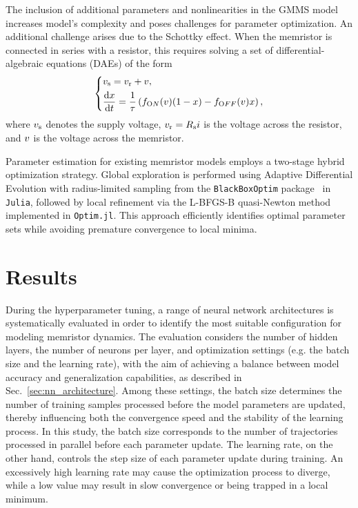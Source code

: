 \documentclass{ieeeaccess}
\begin{document}
The inclusion of additional parameters and nonlinearities in the GMMS model increases model's complexity and poses challenges for parameter optimization.
An additional challenge arises due to the Schottky effect. 
When the memristor is connected in series with a resistor, this requires solving a set of differential-algebraic equations (DAEs) of the form
\begin{equation}
  \left\{
  \begin{aligned}
     & v_{\mathrm s}=v_{\mathrm r}+ v,                                                      \\
     & \frac{{\mathrm d} {x}}{{\mathrm d} t}  = \frac{1}{\tau} \left( f_{\text ON} (v) (1-x) - f_{\text OFF} (v) x \right), 
  \end{aligned}
  \right.
  \label{eq:nonlinear_eq}
\end{equation}
where \(v_{\mathrm s}\) denotes the supply voltage, \(v_{\mathrm r}=R_{\mathrm s} i\) is the voltage across the resistor, and \(v\) is the voltage across the memristor.


Parameter estimation for existing memristor models employs a two-stage hybrid optimization strategy. Global exploration is performed using Adaptive Differential Evolution with radius-limited sampling from the \texttt{BlackBoxOptim} package~\cite{BlackBoxOptim} in \texttt{Julia}, followed by local refinement via the L-BFGS-B quasi-Newton method~\cite{Zhu1997} implemented in \texttt{Optim.jl}. This approach efficiently identifies optimal parameter sets while avoiding premature convergence to local minima.


\section{Results}
\label{sec:results}

During the hyperparameter tuning, a range of neural network architectures is systematically evaluated in order to identify the most suitable configuration for modeling memristor dynamics. The evaluation considers the number of hidden layers, the number of neurons per layer, and optimization settings (e.g. the batch size and the learning rate), with the aim of achieving a balance between model accuracy and generalization capabilities, as described in Sec.~\ref{sec:nn_architecture}. Among these settings, the batch size determines the number of training samples processed before the model parameters are updated, thereby influencing both the convergence speed and the stability of the learning process. In this study, the batch size corresponds to the number of trajectories processed in parallel before each parameter update. The learning rate, on the other hand, controls the step size of each parameter update during training. An excessively high learning rate may cause the optimization process to diverge, while a low value may result in slow convergence or being trapped in a local minimum.
\end{document}
